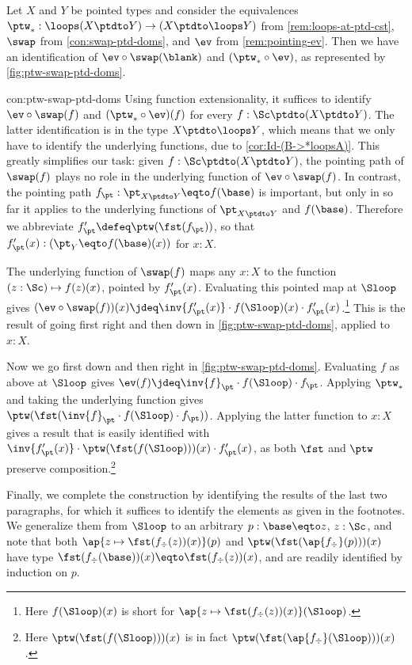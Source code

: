 \begin{construction}\label{con:ptw-swap-ptd-doms}
Let $X$ and $Y$ be pointed types and 
consider the equivalences $\ptw_*: \loops(X\ptdto Y) \to (X\ptdto \loops Y)$
from \cref{rem:loops-at-ptd-cst}, $\swap$ from \cref{con:swap-ptd-doms},
and $\ev$ from \cref{rem:pointing-ev}. 
Then we have an identification of $\ev\circ\swap(\blank)$ 
and $(\ptw_*\circ\ev)$, as represented by \cref{fig:ptw-swap-ptd-doms}.
\end{construction}
\begin{implementation}{con:ptw-swap-ptd-doms}
Using function extensionality, it suffices to identify ${\ev}\circ{\swap(f)}$
and $(\ptw_*\circ\ev)(f)$ for every $f:\Sc\ptdto(X\ptdto Y)$. The latter
identification is in the type $X\ptdto\loops Y$, which means that we only 
have to identify the underlying functions, due to \cref{cor:Id-(B->*loopsA)}.
This greatly simplifies our task: given $f:\Sc\ptdto(X\ptdto Y)$,
the pointing path of $\swap(f)$ plays no role in 
the underlying function of $\ev\circ{\swap(f)}$.
In contrast, the pointing path $f_\pt: \pt_{X\ptdto Y} \eqto f(\base)$
is important, but only in so far it applies to the underlying functions
of $\pt_{X\ptdto Y}$ and $f(\base)$. Therefore we abbreviate
$f'_\pt \defeq \ptw(\fst(f_\pt))$, so that 
$f'_\pt(x): (\pt_Y \eqto f(\base)(x))$ for $x:X$.

The underlying function of $\swap(f)$ maps any $x:X$ to the 
function $(z:\Sc)\mapsto f(z)(x)$, pointed by $f'_\pt(x)$.
Evaluating this pointed map at $\Sloop$ gives
$({\ev}\circ{\swap(f)})(x) \jdeq 
\inv{f'_\pt(x)}\cdot f(\Sloop)(x)\cdot f'_\pt(x)$.\footnote{%
Here $f(\Sloop)(x)$ is short for $\ap{z\mapsto\fst(f_\div(z))(x)}(\Sloop)$.}
This is the result of going first right and then down in
\cref{fig:ptw-swap-ptd-doms}, applied to $x:X$.

Now we go first down and then right in \cref{fig:ptw-swap-ptd-doms}.
Evaluating $f$ as above at $\Sloop$ gives
$\ev(f) \jdeq \inv{f}_\pt\cdot f(\Sloop)\cdot f_\pt$.
Applying $\ptw_*$ and taking the underlying function gives
$\ptw(\fst(\inv{f}_\pt\cdot f(\Sloop)\cdot f_\pt))$.
Applying the latter function to $x:X$ gives a result
that is easily identified with 
$\inv{f'_\pt(x)}\cdot \ptw(\fst(f(\Sloop)))(x)\cdot f'_\pt(x)$,
as both $\fst$ and $\ptw$ preserve composition.\footnote{%
Here $\ptw(\fst(f(\Sloop)))(x)$ is in fact 
$\ptw(\fst(\ap{f_\div}(\Sloop)))(x)$.}

Finally, we complete the construction by identifying the results
of the last two paragraphs, for which it suffices to identify
the elements as given in the footnotes. We generalize them from $\Sloop$
to an arbitrary $p:\base\eqto z$, $z:\Sc$, and note that both
$\ap{z\mapsto\fst(f_\div(z))(x)}(p)$ and
$\ptw(\fst(\ap{f_\div}(p)))(x)$ have type
$\fst(f_\div(\base))(x) \eqto \fst(f_\div(z))(x)$,
and are readily identified by induction on $p$. 
\end{implementation}

